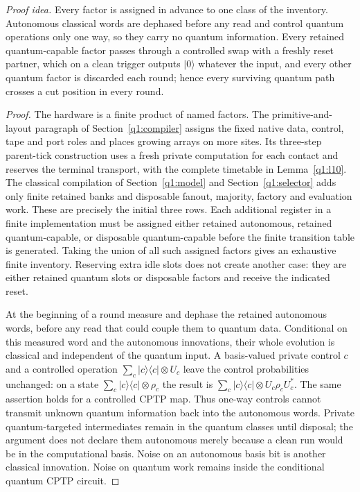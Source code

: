 \par\noindent\emph{Proof idea.} Every factor is assigned in advance to one class of the inventory. Autonomous classical words are dephased before any read and control quantum operations only one way, so they carry no quantum information. Every retained quantum-capable factor passes through a controlled swap with a freshly reset partner, which on a clean trigger outputs \(\lvert0\rangle\) whatever the input, and every other quantum factor is discarded each round; hence every surviving quantum path crosses a cut position in every round.

\begin{proof}
The hardware is a finite product of named factors.
The primitive-and-layout paragraph of Section~\ref{q1:compiler}
assigns the fixed native data, control, tape and port roles and places
growing arrays on more sites. Its three-step parent-tick construction
uses a fresh private computation for each contact and reserves the
terminal transport, with the complete timetable in Lemma~\ref{q1:l10}. The classical compilation of Section~\ref{q1:model} and Section~\ref{q1:selector} adds only finite retained banks and disposable fanout, majority, factory and evaluation work. These are precisely the initial three rows. Each additional register in a finite implementation must be assigned either retained autonomous, retained quantum-capable, or disposable quantum-capable before the finite transition table is generated. Taking the union of all such assigned factors gives an exhaustive finite inventory. Reserving extra idle slots does not create another case: they are either retained quantum slots or disposable factors and receive the indicated reset.

At the beginning of a round measure and dephase the retained autonomous words, before any read that could couple them to quantum data. Conditional on this measured word and the autonomous innovations, their whole evolution is classical and independent of the quantum input. A basis-valued private control \(c\) and a controlled operation \(\sum _{c} \lvert c\rangle\langle c\rvert \otimes U_{c}\) leave the control probabilities unchanged: on a state \(\sum _{c} \lvert c\rangle\langle c\rvert \otimes \rho_{c}\) the result is \(\sum _{c} \lvert c\rangle\langle c\rvert \otimes U_{c} \rho_{c} U_{c}^{*}\). The same assertion holds for a controlled CPTP map. Thus one-way controls cannot transmit unknown quantum information back into the autonomous words. Private quantum-targeted intermediates remain in the quantum classes until disposal; the argument does not declare them autonomous merely because a clean run would be in the computational basis. Noise on an autonomous basis bit is another classical innovation. Noise on quantum work remains inside the conditional quantum CPTP circuit.


\end{proof}
